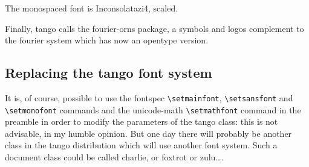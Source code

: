 \documentclass[english,ColorTheme=Red,FontSize=10pt]{tango}
\newcommand\TO[1]{\textsf{#1}}
\begin{document}
The monospaced font is Inconsolatazi4, scaled.

Finally, tango calls the \TO{fourier-orns} package, a symbols and logos complement to the fourier system which has now an opentype version. 

\subsection{Replacing the tango font system}
It is, of course, possible to use the  \TO{fontspec} \verb=\setmainfont=, \verb=\setsansfont= and \verb=\setmonofont= commands and the \TO{unicode-math} \verb=\setmathfont= command in the preamble in order to modify the parameters of the tango class: this is not advisable, in my humble opinion. But one day there will probably be another class in the tango distribution which will use another font system. Such a document class could be called charlie, or foxtrot or zulu….
\end{document}
